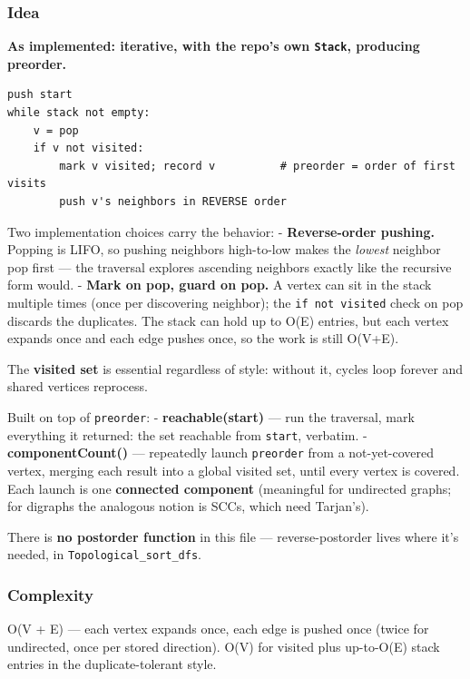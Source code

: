 \documentclass[
  10pt,
  letterpaper,
  onecolumn]{article}
\begin{document}
\hypertarget{idea-7}{%
\subsubsection{Idea}\label{idea-7}}

\textbf{As implemented: iterative, with the repo's own \texttt{Stack},
producing preorder.}

\begin{verbatim}
push start
while stack not empty:
    v = pop
    if v not visited:
        mark v visited; record v          # preorder = order of first visits
        push v's neighbors in REVERSE order
\end{verbatim}

Two implementation choices carry the behavior: - \textbf{Reverse-order
pushing.} Popping is LIFO, so pushing neighbors high-to-low makes the
\emph{lowest} neighbor pop first --- the traversal explores ascending
neighbors exactly like the recursive form would. - \textbf{Mark on pop,
guard on pop.} A vertex can sit in the stack multiple times (once per
discovering neighbor); the \texttt{if\ not\ visited} check on pop
discards the duplicates. The stack can hold up to O(E) entries, but each
vertex expands once and each edge pushes once, so the work is still
O(V+E).

The \textbf{visited set} is essential regardless of style: without it,
cycles loop forever and shared vertices reprocess.

Built on top of \texttt{preorder}: - \textbf{reachable(start)} --- run
the traversal, mark everything it returned: the set reachable from
\texttt{start}, verbatim. - \textbf{componentCount()} --- repeatedly
launch \texttt{preorder} from a not-yet-covered vertex, merging each
result into a global visited set, until every vertex is covered. Each
launch is one \textbf{connected component} (meaningful for undirected
graphs; for digraphs the analogous notion is SCCs, which need Tarjan's).

There is \textbf{no postorder function} in this file ---
reverse-postorder lives where it's needed, in
\texttt{Topological\_sort\_dfs}.

\hypertarget{complexity-7}{%
\subsubsection{Complexity}\label{complexity-7}}

O(V + E) --- each vertex expands once, each edge is pushed once (twice
for undirected, once per stored direction). O(V) for visited plus
up-to-O(E) stack entries in the duplicate-tolerant style.
\end{document}

